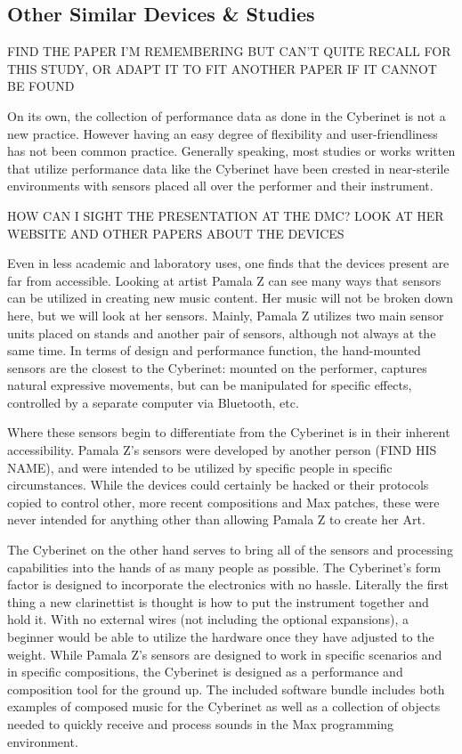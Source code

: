 \subsection{Other Similar Devices \& Studies}

FIND THE PAPER I'M REMEMBERING BUT CAN'T QUITE RECALL FOR THIS STUDY, OR ADAPT IT TO FIT ANOTHER PAPER IF IT CANNOT BE FOUND

On its own, the collection of performance data as done in the Cyberinet is not a new practice. However having an easy degree of flexibility and user-friendliness has not been common practice. Generally speaking, most studies or works written that utilize performance data like the Cyberinet have been crested in near-sterile environments with sensors placed all over the performer and their instrument. 

HOW CAN I SIGHT THE PRESENTATION AT THE DMC? LOOK AT HER WEBSITE AND OTHER PAPERS ABOUT THE DEVICES

Even in less academic and laboratory uses, one finds that the devices present are far from accessible. Looking at artist Pamala Z can see many ways that sensors can be utilized in creating new music content. Her music will not be broken down here, but we will look at her sensors. Mainly, Pamala Z utilizes two main sensor units placed on stands and another pair of sensors, although not always at the same time. In terms of design and performance function, the hand-mounted sensors are the closest to the Cyberinet: mounted on the performer, captures natural expressive movements, but can be manipulated for specific effects, controlled by a separate computer via Bluetooth, etc.

Where these sensors begin to differentiate from the Cyberinet is in their inherent accessibility. Pamala Z's sensors were developed by another person (FIND HIS NAME), and were intended to be utilized by specific people in specific circumstances. While the devices could certainly be hacked or their protocols copied to control other, more recent compositions and Max patches, these were never intended for anything other than allowing Pamala Z to create her Art. 

The Cyberinet on the other hand serves to bring all of the sensors and processing capabilities into the hands of as many people as possible. The Cyberinet's form factor is designed to incorporate the electronics with no hassle. Literally the first thing a new clarinettist is thought is how to put the instrument together and hold it. With no external wires (not including the optional expansions), a beginner would be able to utilize the hardware once they have adjusted to the weight. While Pamala Z's sensors are designed to work in specific scenarios and in specific compositions, the Cyberinet is designed as a performance and composition tool for the ground up. The included software bundle includes both examples of composed music for the Cyberinet as well as a collection of objects needed to quickly receive and process sounds in the Max programming environment. 


